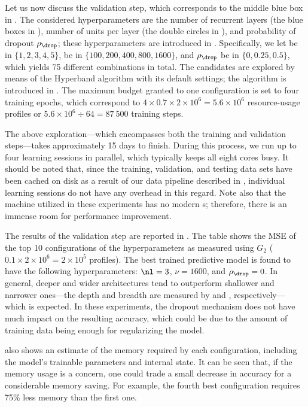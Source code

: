 Let us now discuss the validation step, which corresponds to the middle blue box
in . The considered hyperparameters are the number of
recurrent layers \nl (the blue boxes in ), number of units per
layer \nu (the double circles in ), and probability of dropout
$\rho_\drop$; these hyperparameters are introduced in .
Specifically, we let \nl be in $\{ 1, 2, 3, 4, 5 \}$, \nu be in $\{ 100, 200,
400, 800, 1600 \}$, and $\rho_\drop$ be in $\{ 0, 0.25, 0.5 \}$, which yields 75
different combinations in total. The candidates are explored by means of the
Hyperband algorithm with its default settings; the algorithm is introduced in
. The maximum budget granted to one configuration is set to
four training epochs, which correspond to $4 \times 0.7 \times 2 \times 10^6 =
5.6 \times 10^6$ resource-usage profiles or $5.6 \times 10^6 \div 64 = 87~500$
training steps.

The above exploration---which encompasses both the training and validation
steps---takes approximately 15 days to finish. During this process, we run up to
four learning sessions in parallel, which typically keeps all eight cores busy.
It should be noted that, since the training, validation, and testing data sets
have been cached on disk as a result of our data pipeline described in
, individual learning sessions do not have any overhead in this
regard. Note also that the machine utilized in these experiments has no modern
s; therefore, there is an immense room for performance improvement.

The results of the validation step are reported in . The
table shows the \ac{MSE} of the top 10 configurations of the hyperparameters as
measured using $G_2$ ($0.1 \times 2 \times 10^6 = 2 \times 10^5$ profiles). The
best trained predictive model is found to have the following hyperparameters:
$\nl = 3$, $\nu = 1600$, and $\rho_\drop = 0$. In general, deeper and wider
architectures tend to outperform shallower and narrower ones---the depth and
breadth are measured by \nl and \nu, respectively---which is expected. In these
experiments, the dropout mechanism does not have much impact on the resulting
accuracy, which could be due to the amount of training data being enough for
regularizing the model.

 also shows an estimate of the memory required by each
configuration, including the model's trainable parameters and internal state. It
can be seen that, if the memory usage is a concern, one could trade a small
decrease in accuracy for a considerable memory saving. For example, the fourth
best configuration requires 75\% less memory than the first one.

